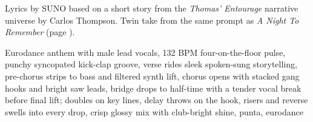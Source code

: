 
\label{sec:natalia-in-milan}
\begin{notes}
Lyrics by SUNO based on a short story from the \emph{Thomas’ Entourage} narrative universe by Carlos Thompson. Twin take from the same prompt as \emph{A Night To Remember} (page \pageref{sec:a-night-to-remember}).
\end{notes}
\begin{style}
Eurodance anthem with male lead vocals, 132 BPM four-on-the-floor pulse, punchy syncopated kick-clap groove, verse rides sleek spoken-sung storytelling, pre-chorus strips to bass and filtered synth lift, chorus opens with stacked gang hooks and bright saw leads, bridge drops to half-time with a tender vocal break before final lift; doubles on key lines, delay throws on the hook, risers and reverse swells into every drop, crisp glossy mix with club-bright shine, punta, eurodance
\end{style}
